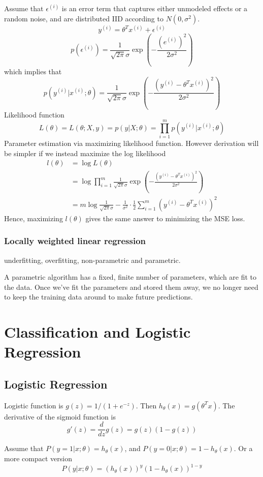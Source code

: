  Assume that $\epsilon^{(i)}$ is an error term that captures either unmodeled
 effects or a random noise, and are distributed IID according to $N(0,\sigma^2)$.
 $$y^{(i)} = \theta^Tx^{(i)} + \epsilon^{(i)}$$
 $$p(\epsilon^{(i)}) = \frac{1}{\sqrt{2\pi}\sigma} \exp(
  -\frac{(e^{(i)})^2}{2\sigma^2})$$
 which implies that
 $$p(y^{(i)}|x^{(i)};\theta) = \frac{1}{\sqrt{2\pi}\sigma} \exp(
  -\frac{(y^{(i)} - \theta^Tx^{(i)})^2}{2\sigma^2})$$
 Likelihood function
 $$L(\theta) = L(\theta;X,y) = p(y|X;\theta) =
  \prod_{i=1}^m p(y^{(i)}|x^{(i)};\theta)$$
 Parameter estimation via maximizing likelihood function. However derivation
 will be simpler if we instead maximize the log likelihood
 \begin{align}
	 l(\theta) &= \log L(\theta) \\
			   &= \log \prod_{i=1}^m \frac{1}{\sqrt{2\pi}\sigma} \exp(
			    -\frac{(y^{(i)} - \theta^Tx^{(i)})^2}{2\sigma^2}) \\
			   &= m\log \frac{1}{\sqrt{2\pi}\sigma} -
				\frac{1}{\sigma^2}\cdot \frac{1}{2} \sum_{i=1}^m
				(y^{(i)} - \theta^Tx^{(i)})^2
 \end{align}
 Hence, maximizing $l(\theta)$ gives the same answer to minimizing the MSE loss.

 \subsubsection{Locally weighted linear regression}
 underfitting, overfitting, non-parametric and parametric.

 A parametric algorithm has a fixed, finite number of parameters, which are fit
 to the data. Once we've fit the parameters and stored them away, we no longer
 need to keep the training data around to make future predictions.


\section{Classification and Logistic Regression}

\subsection{Logistic Regression}

Logistic function is $g(z) = 1/(1+e^{-z})$. Then $h_\theta(x)=g(\theta^Tx)$.
The derivative of the sigmoid function is
$$g'(z) = \frac{d}{dz}g(z) = g(z)(1-g(z))$$

Assume that $P(y=1|x;\theta) = h_\theta(x)$, and
$P(y=0|x;\theta) = 1 - h_\theta(x)$. Or a more compact version
$$P(y|x;\theta) = (h_\theta(x))^y(1-h_\theta(x))^{1-y}$$

